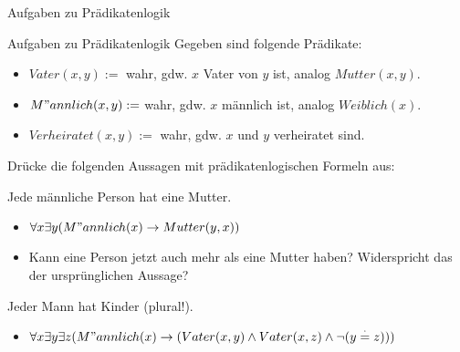 \begin{frame}{Aufgaben zu Prädikatenlogik}
	\begin{taskblock}{Aufgaben zu Prädikatenlogik}
		Gegeben sind folgende Prädikate:
		\begin{itemize}
			\item $Vater(x,y) := $ wahr, gdw. $x$ Vater von $y$ ist, analog $Mutter(x,y)$.
			\item $M"annlich(x,y) := $ wahr, gdw. $x$ männlich ist, analog $Weiblich(x)$.
			\item $Verheiratet(x,y) := $ wahr, gdw. $x$ und $y$ verheiratet sind.
		\end{itemize}
	
	
		Drücke die folgenden Aussagen mit prädikatenlogischen Formeln aus:
		
		\begin{itemize}
			\pitem Jede männliche Person hat eine Mutter.
			\begin{itemize}
				\pause\item $\forall x \exists y (M"annlich(x) \rightarrow Mutter(y,x))$
				\pause\item Kann eine Person jetzt auch mehr als eine Mutter haben? \pause Widerspricht das der ursprünglichen Aussage?
			\end{itemize}
			\pitem Jeder Mann hat Kinder (plural!).
			\begin{itemize}
				\pause\item $\forall x \exists y \exists z (M"annlich(x) \rightarrow ( Vater(x,y) \land Vater(x,z) \land \lnot (y \stackrel{\cdot}{=} z)))$
			\end{itemize}
		\end{itemize}
	\end{taskblock}
\end{frame}

